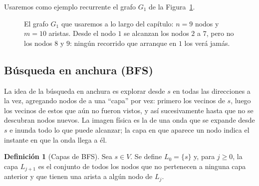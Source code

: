 \documentclass[12pt, spanish, oneside, openany]{book}
\theoremstyle{uprightplain}
\theoremstyle{definition}
\newtheorem{definicion}[teorema]{Definición}
\theoremstyle{remark}
\theoremstyle{definition}
\begin{document}
Usaremos como ejemplo recurrente el grafo $G_1$ de la Figura~\ref{fig:grafo-ejemplo}.

\begin{figure}[H]
\centering
{}
\caption{El grafo $G_1$ que usaremos a lo largo del capítulo: $n=9$ nodos y
$m=10$ aristas. Desde el nodo $1$ se alcanzan los nodos $2$ a $7$, pero no los
nodos $8$ y $9$: ningún recorrido que arranque en $1$ los verá jamás.}
\label{fig:grafo-ejemplo}
\end{figure}

\subsection{Búsqueda en anchura (BFS)}

La idea de la búsqueda en anchura es explorar desde $s$ en todas las direcciones a la vez, agregando nodos de a una ``capa'' por vez: primero los vecinos de $s$, luego los vecinos de estos que aún no fueron vistos, y así sucesivamente hasta que no se descubran nodos nuevos. La imagen física es la de una onda que se expande desde $s$ e inunda todo lo que puede alcanzar; la capa en que aparece un nodo indica el instante en que la onda llega a él.

\begin{definicion}[Capas de BFS]
\label{def:capas}
Sea $s\in V$. Se define $L_0=\{s\}$ y, para $j\ge 0$, la capa $L_{j+1}$ es el conjunto de todos los nodos que no pertenecen a ninguna capa anterior y que tienen una arista a algún nodo de $L_j$.
\end{definicion}
\end{document}
